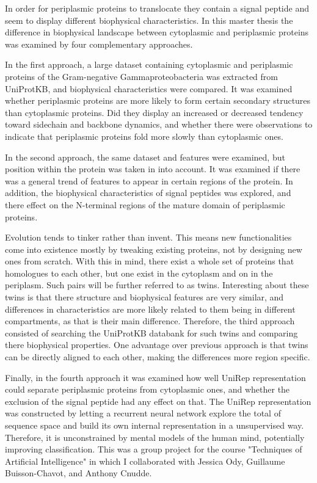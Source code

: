 In order for periplasmic proteins to translocate they contain a signal peptide 
and seem to display different biophysical characteristics.
In this master thesis the difference in biophysical landscape between cytoplasmic 
and periplasmic proteins was examined by four complementary approaches.

In the first approach,
a large dataset containing cytoplasmic and periplasmic proteins of the Gram-negative Gammaproteobacteria was extracted from UniProtKB,
and biophysical characteristics were compared.
It was examined whether periplasmic proteins are more likely to form certain secondary structures than cytoplasmic proteins.
Did they display an increased or decreased tendency toward sidechain and backbone dynamics,
and whether there were observations to indicate that periplasmic proteins fold more slowly than cytoplasmic ones.

In the second approach, the same dataset and features were examined, 
but position within the protein was taken in into account.
It was examined if there was a general trend of features to appear in certain regions of the protein.
In addition, the biophysical characteristics of signal peptides was explored,
and there effect on the N-terminal regions of the mature domain of periplasmic proteins.

Evolution tends to tinker rather than invent.
This means new functionalities come into existence mostly by tweaking existing proteins, 
not by designing new ones from scratch. 
With this in mind,
there exist a whole set of proteins that homologues to each other, 
but one exist in the cytoplasm and on in the periplasm.
Such pairs will be further referred to as twins.
Interesting about these twins is that there structure and biophysical features are very similar,
and differences in characteristics are more likely related to them being in different compartments,
as that is their main difference.
Therefore, the third approach consisted of searching the UniProtKB databank for such twins and comparing there biophysical properties.
One advantage over previous approach is that twins can be directly aligned to each other,
making the differences more region specific.


Finally, in the fourth approach it was examined how well UniRep representation could separate periplasmic proteins from cytoplasmic ones,
and whether the exclusion of the signal peptide had any effect on that.
The UniRep representation was constructed by letting a recurrent neural network explore the total of sequence space and build its own internal representation in a unsupervised way.
Therefore, it is unconstrained by mental models of the human mind, 
potentially improving classification.
This was a group project for the course "Techniques of Artificial Intelligence" in which I collaborated with 
Jessica Ody, 
Guillaume Buisson-Chavot, 
and Anthony Cnudde.
